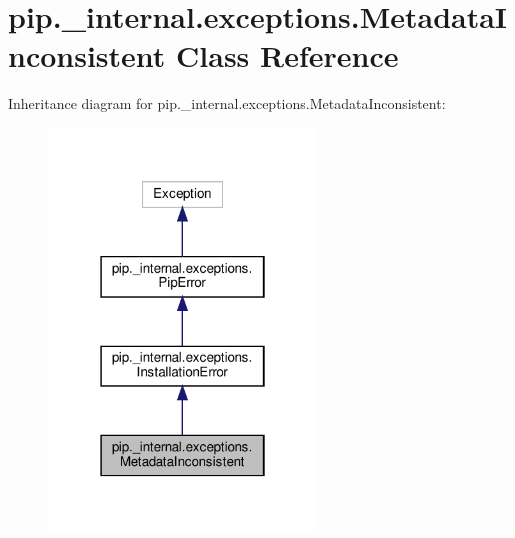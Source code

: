 \hypertarget{classpip_1_1__internal_1_1exceptions_1_1MetadataInconsistent}{}\section{pip.\+\_\+internal.\+exceptions.\+Metadata\+Inconsistent Class Reference}
\label{classpip_1_1__internal_1_1exceptions_1_1MetadataInconsistent}


Inheritance diagram for pip.\+\_\+internal.\+exceptions.\+Metadata\+Inconsistent\+:
\nopagebreak
\begin{figure}[H]
\begin{center}
\leavevmode
\includegraphics[width=202pt]{classpip_1_1__internal_1_1exceptions_1_1MetadataInconsistent__inherit__graph}
\end{center}
\end{figure}


